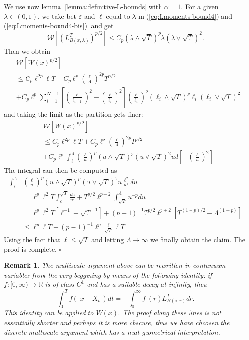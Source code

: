 \documentclass[a4paper,12pt]{article}
\newtheorem{remark}{Remark}
\begin{document}
We use now lemma~\ref{lemma:definitive-L-bounds} with $\alpha=1$. For a given
$\lambda\in\left(  0,1\right)  $, we take bot $\varepsilon$ and $\ell$ equal
to $\lambda$ in (\ref{eq:Lmoments-bound4}) and (\ref{eq:Lmoments-bound4-bis}),
and get
\[
\mathcal{W}\left[  \left(  L_{B(x,\lambda)}^{T}\right)  ^{p/2}\right]  \leq
C_{p}(\lambda\wedge\sqrt{T})^{p}\lambda(\lambda\vee\sqrt{T})^{2}.
\]
Then we obtain
\begin{align*}
&  \mathcal{W}\left[  W(x)^{p/2}\right] \\
&  \leq C_{p}\ell^{2p}\ell T+C_{p}\ell^{p}\left(  \frac{\ell}{\Lambda}\right)
^{2p}T^{p/2}\\
&  +C_{p}\ell^{p}\sum_{i=1}^{N-1}\left[  \left(  \frac{\ell}{\ell_{i-1}%
}\right)  ^{2}-\left(  \frac{\ell}{\ell_{i}}\right)  ^{2}\right]  \left(
\frac{\ell}{\ell_{i}}\right)  ^{p}(\ell_{i}\wedge\sqrt{T})^{p}\ell_{i}%
(\ell_{i}\vee\sqrt{T})^{2}%
\end{align*}
and taking the limit as the partition gets finer:
\[%
\begin{split}
&  \mathcal{W}\left[  W(x)^{p/2}\right] \\
&  \leq C_{p}\ell^{2p}\ell T+C_{p}\ell^{p}\left(  \frac{\ell}{\Lambda}\right)
^{2p}T^{p/2}\\
&  +C_{p}\ell^{p}\int_{\ell}^{\Lambda}\left(  \frac{\ell}{u}\right)
^{p}(u\wedge\sqrt{T})^{p}(u\vee\sqrt{T})^{2}ud\left[  -\left(  \frac{\ell}%
{u}\right)  ^{2}\right]
\end{split}
\]
The integral can then be computed as
\[%
\begin{split}
\int_{\ell}^{\Lambda}  &  \left(  \frac{\ell}{u}\right)  ^{p}(u\wedge\sqrt
{T})^{p}(u\vee\sqrt{T})^{2}u\frac{\ell^{2}}{u^{3}}du\\
&  =\ell^{p}\ell^{2}T\int_{\ell}^{\sqrt{T}}\frac{du}{u^{2}}+T^{p/2}\ell
^{p+2}\int_{\sqrt{T}}^{\Lambda}u^{-p}du\\
&  =\ell^{p}\ell^{2}T[\ell^{-1}-\sqrt{T}^{-1}]+(p-1)^{-1}T^{p/2}\ell
^{p+2}[T^{(1-p)/2}-\Lambda^{(1-p)}]\\
&  \leq\ell^{p}\ell T+(p-1)^{-1}\ell^{p}\frac{\ell}{\sqrt{T}}\ell T
\end{split}
\]
Using the fact that $\ell\leq\sqrt{T}$ and letting $\Lambda\rightarrow\infty$
we finally obtain the claim. The proof is complete. \hfill$\square$\\[0.5cm]

\begin{remark}
The multiscale argument above can be rewritten in contunuum variables from the
very beggining by means of the following identity: if $f:[0,\infty
)\rightarrow\mathbb{R}$ is of class $C^{1}$ and has a suitable decay at
infinity, then%
\[
\int_{0}^{T}f\left(  \left|  x-X_{t}\right|  \right)  dt=-\int_{0}^{\infty
}f^{\prime}\left(  r\right)  L_{B(x,r)}^{T}dr.
\]
This identity can be applied to $W(x)$. The proof along these lines is not
essentially shorter and perhaps it is more obscure, thus we have choosen the
discrete multiscale argument which has a neat geometrical interpretation.
\end{remark}
\end{document}
